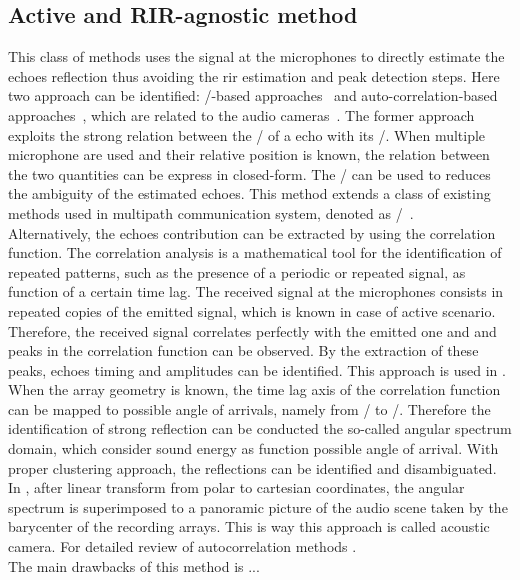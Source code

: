 \subsection{Active and RIR-agnostic method}
This class of methods uses the signal at the microphones to directly estimate the echoes reflection thus avoiding the rir estimation and peak detection steps.
Here two approach can be identified: \ML/-based approaches~ and auto-correlation-based approaches~, which are related to the audio cameras~.
The former approach exploits the strong relation between the \TOA/ of a echo with its \DOA/.
When multiple microphone are used and their relative position is known, the relation between the two quantities can be express in closed-form.
The \DOA/ can be used to reduces the ambiguity of the estimated echoes.
This method extends a class of existing methods used in multipath communication system, denoted as \JADE/~.
\\Alternatively, the echoes contribution can be extracted by using the correlation function.
The correlation analysis is a mathematical tool for the identification of repeated patterns, such as the presence of a periodic or repeated signal, as function of a certain time lag.
The received signal at the microphones consists in repeated copies of the emitted signal, which is known in case of active scenario.
Therefore, the received signal correlates perfectly with the emitted one and and peaks in the correlation function can be observed.
By the extraction of these peaks, echoes timing and amplitudes can be identified.
This approach is used in .
\\When the array geometry is known, the time lag axis of the correlation function can be mapped to possible angle of arrivals, namely from \TOAs/ to \DOAs/.
Therefore the identification of strong reflection can be conducted the so-called angular spectrum domain, which consider sound energy as function possible angle of arrival.
With proper clustering approach, the reflections can be identified and disambiguated.
In , after linear transform from polar to cartesian coordinates, the angular spectrum is superimposed to a panoramic picture of the audio scene taken by the barycenter of the recording arrays.
This is way this approach is called acoustic camera.
For detailed review of autocorrelation methods .
\\The main drawbacks of this method is  ...

